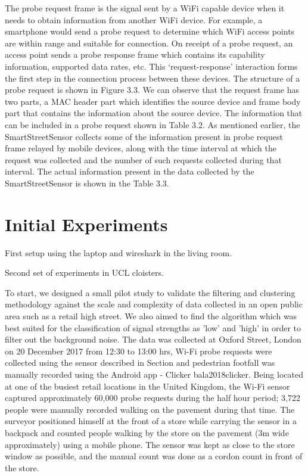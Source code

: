 The probe request frame is the signal sent by a WiFi capable device when it needs to obtain information from another WiFi device.
For example, a smartphone would send a probe request to determine which WiFi access points are within range and suitable for connection.
On receipt of a probe request, an access point sends a probe response frame which contains its capability information, supported data rates, etc.
This ‘request-response’ interaction forms the first step in the connection process between these devices.
The structure of a probe request is shown in Figure 3.3.
We can observe that the request frame has two parts, a MAC header part which identifies the source device and frame body part that contains the information about the source device.
The information that can be included in a probe request shown in Table 3.2.
As mentioned earlier, the SmartStreetSensor collects some of the information present in probe request frame relayed by mobile devices, along with the time interval at which the request was collected and the number of such requests collected during that interval.
The actual information present in the data collected by the SmartStreetSensor is shown in the Table 3.3.

\section{Initial Experiments}

First setup using the laptop and wireshark in the living room.

Second set of experiments in UCL cloisters.

To start, we designed a small pilot study to validate the filtering and clustering methodology against the scale and complexity of data collected in an open public area such as a retail high street. We also aimed to find the algorithm which was best suited for the classification of signal strengths as 'low' and 'high' in order to filter out the background noise. The data was collected at Oxford Street, London on 20 December 2017 from 12:30 to 13:00 hrs, Wi-Fi probe requests were collected using the sensor described in Section and pedestrian footfall was manually recorded using the Android app - Clicker bala2018clicker. Being located at one of the busiest retail locations in the United Kingdom, the Wi-Fi sensor captured approximately 60,000 probe requests during the half hour period; 3,722 people were manually recorded walking on the pavement during that time. The surveyor positioned himself at the front of a store while carrying the sensor in a backpack and counted people walking by the store on the pavement (3m wide approximately) using a mobile phone. The sensor was kept as close to the store window as possible, and the manual count was done as a cordon count in front of the store.

